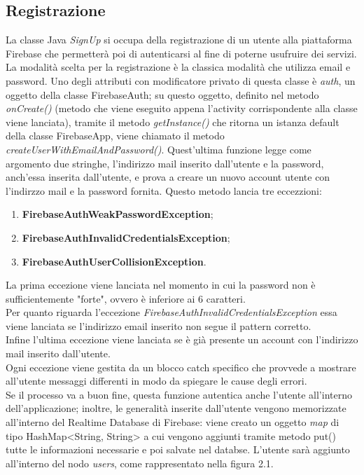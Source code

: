 \documentclass[a4paper,11pt,twoside,openright]{report}
\begin{document}
\subsection{Registrazione}
La classe Java \textit{SignUp} si occupa della registrazione di un utente alla piattaforma Firebase che permetterà poi di autenticarsi al fine di poterne usufruire dei servizi.\\
La modalità scelta per la registrazione è la classica modalità che utilizza email e password. Uno degli attributi con modificatore privato di questa classe è \textit{auth}, un oggetto della classe FirebaseAuth; su questo oggetto, definito nel metodo \textit{onCreate()}\cite{3} (metodo che viene eseguito appena l'activity corrispondente alla classe viene lanciata), tramite il metodo \textit{getInstance()} che ritorna un istanza default della classe FirebaseApp, viene chiamato il metodo \textit{createUserWithEmailAndPassword()}\cite{4}. Quest'ultima funzione legge come argomento due stringhe, l'indirizzo mail inserito dall'utente e la password, anch'essa inserita dall'utente, e prova a creare un nuovo account utente con l'indirzzo mail e la password fornita. Questo metodo lancia tre eccezzioni:

\begin{enumerate}
\item \textbf{FirebaseAuthWeakPasswordException};

\item \textbf{FirebaseAuthInvalidCredentialsException};

\item \textbf{FirebaseAuthUserCollisionException}.
\end{enumerate}

La prima eccezione viene lanciata nel momento in cui la password non è sufficientemente "forte", ovvero è inferiore ai 6 caratteri.\\
Per quanto riguarda l'eccezione \textit{FirebaseAuthInvalidCredentialsException} essa viene lanciata se l'indirizzo email inserito non segue il pattern corretto.\\
Infine l'ultima eccezione viene lanciata se è già presente un account con l'indirizzo mail inserito dall'utente.\\
Ogni eccezione viene gestita da un blocco catch specifico che provvede a mostrare all'utente messaggi differenti in modo da spiegare le cause degli errori.\\
 Se il processo va a buon fine, questa funzione autentica anche l'utente all'interno dell'applicazione; inoltre, le generalità inserite dall'utente vengono memorizzate all'interno del Realtime Database di Firebase: viene creato un oggetto \textit{map} di tipo HashMap<String, String> a cui vengono aggiunti tramite metodo put() tutte le informazioni necessarie e poi salvate nel databse. L'utente sarà aggiunto all'interno del nodo \textit{users}, come rappresentato nella figura 2.1.
\end{document}
